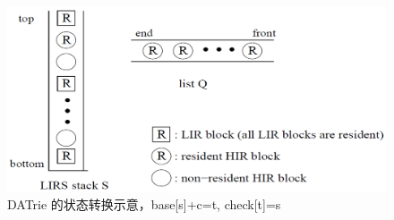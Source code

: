 \begin{figure}[H]
\centering
\includegraphics[keepaspectratio, scale=0.4]{pitures/lirsstack.png}
\caption{ DATrie 的状态转换示意，base[s]+c=t, check[t]=s } 
\end{figure}



